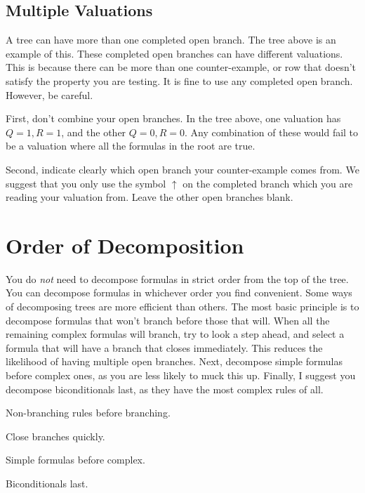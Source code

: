 \documentclass[PHIL101-Textbook.tex]{subfiles}
\begin{document}
\subsection {Multiple Valuations}

A tree can have more than one completed open branch. The tree above is an example of this. These completed open branches can have different valuations. This is because there can be more than one counter-example, or row that doesn't satisfy the property you are testing. It is fine to use any completed open branch. However, be careful.

First, don't combine your open branches. In the tree above, one valuation has $Q=1, R=1$, and the other $Q=0, R=0$. Any combination of these would fail to be a valuation where all the formulas in the root are true.

Second, indicate clearly which open branch your counter-example comes from. We suggest that you only use the symbol $\uparrow$ on the completed branch which you are reading your valuation from. Leave the other open branches blank.



\pagebreak

\section{Order of Decomposition} 
You do \emph{not} need to decompose formulas in strict order from the top of the tree. You can decompose formulas in whichever order you find convenient. Some ways of decomposing trees are more efficient than others. The most basic principle is to decompose formulas that won't branch before those that will. When all the remaining complex formulas will branch, try to look a step ahead, and select a formula that will have a branch that closes immediately. This reduces the likelihood of having multiple open branches. Next, decompose simple formulas before complex ones, as you are less likely to muck this up. Finally, I suggest you decompose biconditionals last, as they have the most complex rules of all.

\begin{earg}
\item Non-branching rules before branching. 
\item Close branches quickly.
\item Simple formulas before complex. 
\item Biconditionals last.
\end{earg}
\end{document}
